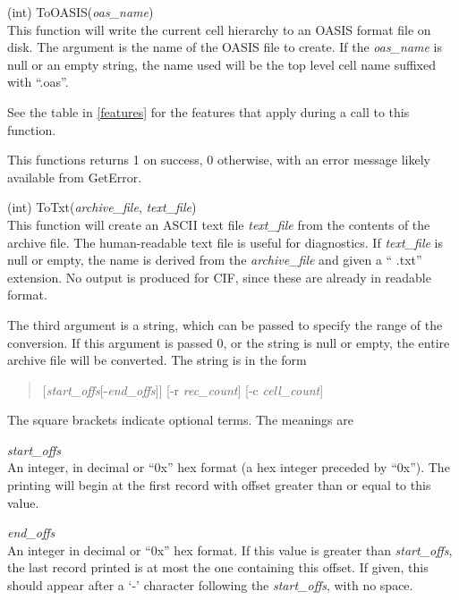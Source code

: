 \begin{description}
\item{(int) \vt ToOASIS({\it oas\_name\/})}\\
This function will write the current cell hierarchy to an OASIS format
file on disk.  The argument is the name of the OASIS file to create. 
If the {\it oas\_name} is null or an empty string, the name used will
be the top level cell name suffixed with ``{\vt .oas}''.

See the table in \ref{features} for the features that apply during a
call to this function.

This functions returns 1 on success, 0 otherwise, with an error
message likely available from {\vt GetError}.

\item{(int) \vt ToTxt({\it archive\_file\/}, {\it text\_file\/})}\\
This function will create an ASCII text file {\it text\_file\/} from
the contents of the archive file.  The human-readable text file is
useful for diagnostics.  If {\it text\_file} is null or empty, the
name is derived from the {\it archive\_file} and given a ``{\vt
.txt}'' extension.  No output is produced for CIF, since these are
already in readable format.

The third argument is a string, which can be passed to specify the
range of the conversion.  If this argument is passed 0, or the string
is null or empty, the entire archive file will be converted.  The
string is in the form

\begin{quote}
    [{\it start\_offs\/}[{\vt -}{\it end\_offs\/}]] [{\vt -r}
      {\it rec\_count\/}] [{\vt -c} {\it cell\_count\/}]
\end{quote}

The square brackets indicate optional terms.  The meanings are

\begin{description}
\item{\it start\_offs}\\
An integer, in decimal or ``{\vt 0x}'' hex format (a hex integer
preceded by ``{\vt 0x}'').  The printing will begin at the first
record with offset greater than or equal to this value.

\item{\it end\_offs}\\
An integer in decimal or ``{\vt 0x}'' hex format.  If this value is
greater than {\it start\_offs}, the last record printed is at most the
one containing this offset.  If given, this should appear after a
`{\vt -}' character following the {\it start\_offs}, with no space.


\end{description}
\end{description}
